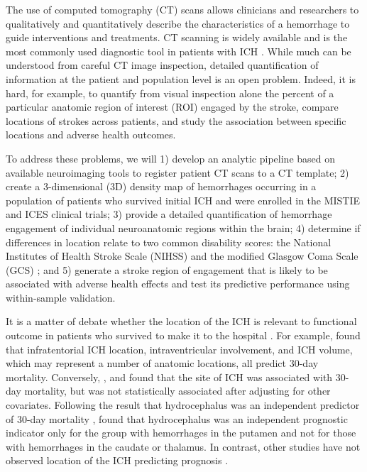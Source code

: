 \documentclass[10pt]{article}\usepackage[]{graphicx}\usepackage[]{color}
\begin{document}
The use of computed tomography (CT) scans allows clinicians and researchers to qualitatively and quantitatively describe the characteristics of a hemorrhage to guide interventions and treatments.  CT scanning is widely available and is the most commonly used diagnostic tool in patients with ICH \citep{sahni_management_2007}. While much can be understood from careful CT image inspection, detailed quantification of information at the patient and population level is an open problem. Indeed, it is hard, for example, to quantify from visual inspection alone the percent of a particular anatomic region of interest (ROI) engaged by the stroke, compare locations of strokes across patients, and study the association between specific locations and adverse health outcomes.

To address these problems, we will 1) develop an analytic pipeline based on available neuroimaging tools to register patient CT scans to a CT template; 2) create a 3-dimensional (3D) density map of hemorrhages occurring in a population of patients who survived initial ICH and were enrolled in the MISTIE and ICES clinical trials; 3) provide a detailed quantification of hemorrhage engagement of individual neuroanatomic regions within the brain; 4) determine if differences in location relate to two common disability scores: the National Institutes of Health Stroke Scale (NIHSS) \citep{brott_measurements_1989} 
and the modified Glasgow Coma Scale (GCS) \citep{teasdale_assessment_1974, teasdale_assessment_1976}; 
and 5) generate a stroke region of engagement that is likely to be associated with adverse health effects and test its predictive performance using within-sample validation.

It is a matter of debate whether the location of the ICH is relevant to functional outcome in patients who survived to make it to the hospital \citep{carhuapoma_intracerebral_2009}. For example, \citet{hemphill_ich_2001} found that infratentorial ICH location, intraventricular involvement, and ICH volume, which may represent a number of anatomic locations, all predict 30-day mortality. Conversely, \citet{chuang_risk_2009}, and \citet{diringer_hydrocephalus:_1998} found that the site of ICH was associated with 30-day mortality, but was not statistically associated after adjusting for other covariates.  Following the result that hydrocephalus was an independent predictor of 30-day mortality \citep{diringer_hydrocephalus:_1998}, \citet{phan_hydrocephalus_2000} found that hydrocephalus was an independent prognostic indicator only for the group with hemorrhages in the putamen and not for those with hemorrhages in the caudate or thalamus. In contrast, other studies have not observed location of the ICH predicting prognosis \citep{portenoy_intracerebral_1987, senant_[multi-factorial_1988, daverat_death_1991, broderick_volume_1993, lisk_early_1994, mase_immediate_1995, qureshi_predictors_1995, razzaq_determinants_1998, hallevy_spontaneous_2002, cheung_use_2003}.  
\end{document}
